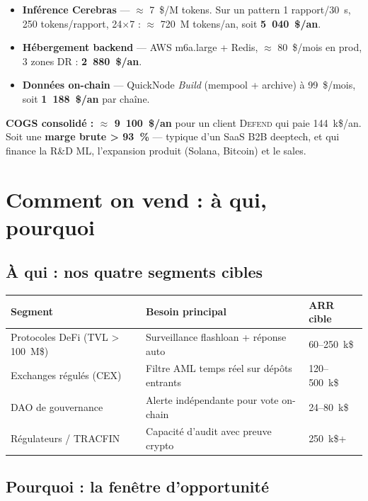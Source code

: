 \documentclass[11pt,a4paper]{article}
\begin{document}
\begin{itemize}
  \item \textbf{Inférence Cerebras} --- $\approx$ 7~\$/M tokens. Sur un
        pattern 1 rapport/30~s, 250 tokens/rapport, 24$\times$7 :
        $\approx$ 720~M tokens/an, soit \textbf{5~040~\$/an}.
  \item \textbf{Hébergement backend} --- AWS m6a.large + Redis,
        $\approx$ 80~\$/mois en prod, 3 zones DR :
        \textbf{2~880~\$/an}.
  \item \textbf{Données on-chain} --- QuickNode \emph{Build}
        (mempool + archive) à 99~\$/mois, soit
        \textbf{1~188~\$/an} par chaîne.
\end{itemize}

\medskip

\textbf{COGS consolidé : $\approx$ 9~100~\$/an} pour un client
\textsc{Defend} qui paie 144~k\$/an. Soit une \textbf{marge brute
> 93~\%} --- typique d'un SaaS B2B deeptech, et qui finance la R\&D ML,
l'expansion produit (Solana, Bitcoin) et le sales.

\section{Comment on vend : à qui, pourquoi}

\subsection{À qui : nos quatre segments cibles}

\begin{tabularx}{\linewidth}{@{}lXl@{}}
\toprule
\textbf{Segment} & \textbf{Besoin principal} & \textbf{ARR cible} \\
\midrule
Protocoles DeFi (TVL > 100~M\$) & Surveillance flashloan + réponse auto & 60--250~k\$ \\
Exchanges régulés (CEX) & Filtre AML temps réel sur dépôts entrants & 120--500~k\$ \\
DAO de gouvernance & Alerte indépendante pour vote on-chain & 24--80~k\$ \\
Régulateurs / TRACFIN & Capacité d'audit avec preuve crypto & 250~k\$+ \\
\bottomrule
\end{tabularx}

\subsection{Pourquoi : la fenêtre d'opportunité}
\end{document}
